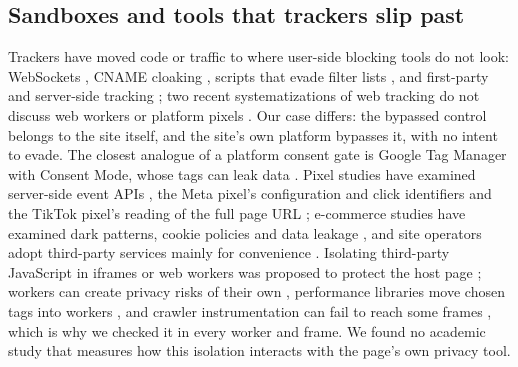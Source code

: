 \subsection*{Sandboxes and tools that trackers slip past}
Trackers have moved code or traffic to where user-side blocking tools do not look: WebSockets \citep{bashir2018websockets}, CNAME cloaking \citep{dimova2021cname}, scripts that evade filter lists \citep{chen2021filterlist}, and first-party and server-side tracking \citep{bottger2026fpt,jazlan2026sstguard}; two recent systematizations of web tracking do not discuss web workers or platform pixels \citep{vekaria2025sok,rieder2026sok}. Our case differs: the bypassed control belongs to the site itself, and the site's own platform bypasses it, with no intent to evade. The closest analogue of a platform consent gate is Google Tag Manager with Consent Mode, whose tags can leak data \citep{mertens2025gtm,mertens2026gtm80k}. Pixel studies have examined server-side event APIs \citep{elfraihi2024meta}, the Meta pixel's configuration and click identifiers \citep{kieserman2025tracker,ghani2026pixelconfig,bekos2023hitchhiker} and the TikTok pixel's reading of the full page URL \citep{zagi2025referrer}; e-commerce studies have examined dark patterns, cookie policies and data leakage \citep{mathur2019dark,singh2025crumbled,vlachogiannakis2025bought}, and site operators adopt third-party services mainly for convenience \citep{utz2023privacy}. Isolating third-party JavaScript in iframes or web workers was proposed to protect the host page \citep{terlouw2010adjail,ingram2012treehouse}; workers can create privacy risks of their own \citep{karami2021sleeper}, performance libraries move chosen tags into workers \citep{partytown}, and crawler instrumentation can fail to reach some frames \citep{krumnow2022openwpm}, which is why we checked it in every worker and frame. We found no academic study that measures how this isolation interacts with the page's own privacy tool.
